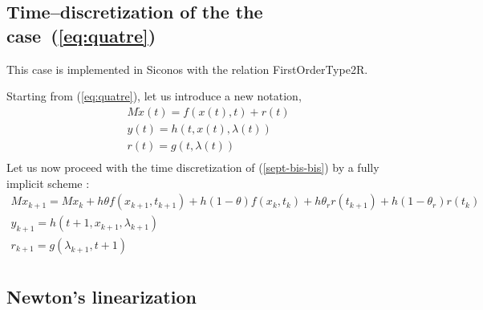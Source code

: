 


\subsection{Time--discretization of the the case~(\ref{eq:quatre}) } 

This case is implemented in Siconos with the relation FirstOrderType2R.

Starting from  (\ref{eq:quatre}), let us introduce a new notation, 
\begin{equation}
\begin{array}{l}
M \dot{x}(t) = f(x(t),t) + r(t)  \\[2mm]
y(t) = h(t,x(t),\lambda (t)) \\[2mm]
r(t) = g(t,\lambda (t) ) \\[2mm]
\end{array}
\label{sept-bis-bis}
\end{equation}
Let us now proceed with the time discretization of (\ref{sept-bis-bis}) by a fully implicit scheme : 
\begin{equation}
  \begin{array}{l}
    \label{eq:toto1}
     M x_{k+1} = M x_{k} +h\theta f(x_{k+1},t_{k+1})+h(1-\theta) f(x_k,t_k) + h \theta _r r(t_{k+1})
     + h(1-\theta _r)r(t_k)  \\[2mm]
     y_{k+1} =  h(t+1,x_{k+1},\lambda _{k+1}) \\[2mm]
     r_{k+1} = g(\lambda_{k+1},t+1)\\[2mm]
  \end{array}
\end{equation}


\subsection{Newton's linearization}


